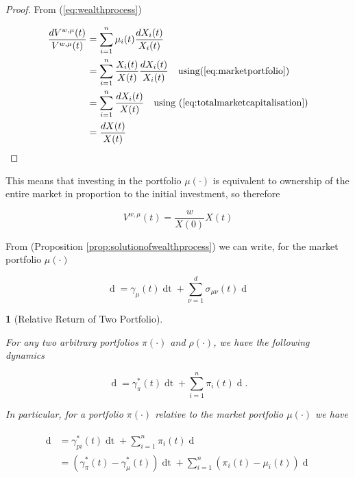 \documentclass[british]{amsart}
\numberwithin{equation}{section}
\numberwithin{figure}{section}
\theoremstyle{plain}
\theoremstyle{definition}
\theoremstyle{plain}
\theoremstyle{plain}
\newtheorem{lem}[thm]{\protect\lemmaname}
\theoremstyle{plain}
\theoremstyle{remark}
\theoremstyle{plain}
\providecommand{\lemmaname}{Lemma}
\renewcommand{\d}[1]{\mathop{\mathrm{d}{#1}}}
\begin{document}
\begin{proof}

	From (\ref{eq:wealthprocess})

	\begin{gather}
		\begin{split}
			\frac{d{V^{w,\mu}(t)}}{V^{w,\mu}(t)} 
				& = \sum_{i=1}^{n} \mu_{i}(t) \frac{d{X_{i}(t)}}{X_{i}(t)} \\ 
				& = \sum_{i=1}^{n} \frac{X_{i}(t)}{X(t)} \frac{d{X_{i}(t)}}{X_{i}(t)} 
					\quad \text{using} (\ref{eq:marketportfolio}) \\ 
				& = \sum_{i=1}^{n} \frac{d{X_{i}(t)}}{X(t)} 
					\quad \text{using } (\ref{eq:totalmarketcapitalisation}) \\ 
				& = \frac{d{X(t)}}{X(t)}  
		\end{split}
	\end{gather}

\end{proof}

This means that investing in the portfolio $\mu(\cdot)$ is equivalent to ownership of
the entire market in proportion to the initial investment, so therefore

\begin{equation}
		V^{w,\mu}(t) = \frac{w}{X(0)}X(t)	
\end{equation}

From (Proposition \ref{prop:solutionofwealthprocess}) we can write, for the market portfolio
$\mu(\cdot)$

\begin{equation}
	\d{V^{w,\mu}(t)} =  
			\gamma_{\mu}(t) \d{t} +
			\sum_{\nu=1}^{d} \sigma_{\mu\nu}(t) \d{W_{\nu}(t)}
\end{equation}

\begin{lem} [Relative Return of Two Portfolio]
	\label{lem:relativereturnoftwoportfolios}

	For any two arbitrary portfolios $\pi(\cdot)$ and $\rho(\cdot)$, we have the following dynamics

	\begin{equation}
		\label{eq:rrdynamics}
		\d{ \log{ \left( \frac{ V^{\pi}(t) }{ V^{\rho}(t) } \right) } } =
			\gamma_{\pi}^{*}(t)\d{t} + 
			\sum_{i=1}^{n} \pi_{i}(t) \d{ \log{ \left( \frac{ X_{i}(t) }{ V^{\rho}(t)} \right) }}.
	\end{equation}

	In particular, for a portfolio $\pi(\cdot)$ relative to the market portfolio $\mu(\cdot)$ we have

	\begin{gather*}
		\label{eq:rrdynamics2}
		\begin{split}	
			\d{ \log{ \left( \frac{ V^(t) }{ V^{\mu}(t) } \right) } } &=
				\gamma_{pi}^{*}(t)\d{t} + 
				\sum_{i=1}^{n} \pi_{i}(t)  \d{ \log{\mu_{i}(t)} } \\
			&=
				(\gamma_{\pi}^{*}(t) - \gamma_{\mu}^{*}(t)) \d{t} + 
				\sum_{i=1}^{n} (\pi_{i}(t) - \mu_{i}(t)) \d{ \log{\mu_{i}(t)} } \\
		\end{split}
	\end{gather*}

\end{lem}
\end{document}
